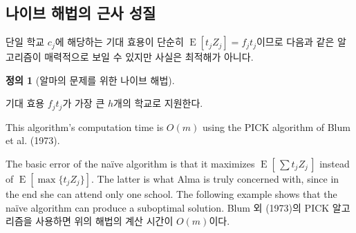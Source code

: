 \documentclass[11pt]{article} %
\newif\ifen
\theoremstyle{definition}
\newtheorem{definition}{Definition}
\theoremstyle{definition}
\newtheorem{definition}{정의}
\begin{document}
\ifen \subsection{Approximation properties of a na\"ive solution}  \else \subsection{나이브 해법의 근사 성질} \fi
\ifen
The expected utility associated with a single school $c_j$ is simply $\operatorname{E}[t_j Z_j] = f_j t_j$. It is therefore tempting to adopt the following strategy, which turns out to be inoptimal.
\else 
단일 학교 $c_j$에 해당하는 기대 효용이 단순히 $\operatorname{E}[t_j Z_j] = f_j t_j$이므로 다음과 같은 알고리즘이 매력적으로 보일 수 있지만 사실은 최적해가 아니다.
\fi
\begin{definition}[\ifen Na\"ive algorithm for Alma’s problem\else 알마의 문제를 위한 나이브 해법\fi] \label{naivealgorithm}
\ifen 
Apply to the $h$ schools having the highest expected utility $f_j t_j$.
\else
기대 효용 $f_j t_j$가 가장 큰 $h$개의 학교로 지원한다.
\fi
\end{definition}
\ifen 
\noindent This algorithm's computation time is $O(m)$ using the PICK algorithm of Blum et al. (1973).

The basic error of the na\"ive algorithm is that it maximizes $\operatorname{E}\left[\,\sum t_j Z_j\, \right]$ instead of $\operatorname{E}\left[\max \{t_j Z_j\} \right]$. The latter is what Alma is truly concerned with, since in the end she can attend only one school. The following example shows that the na\"ive algorithm can produce a suboptimal solution.
\else
\noindent Blum 외 (1973)의 PICK 알고리즘을 사용하면 위의 해법의 계산 시간이 $O(m)$이다.
\end{document}
